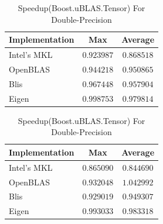 \begin{table}[ht]
    \centering
    \caption{Speedup(Boost.uBLAS.Tensor) For Single-Precision}
    \begin{tabular}{|l|c|c|}
        \hline
        \textbf{Implementation} & \textbf{Max} & \textbf{Average}\\
        \hline
        Intel's MKL         & $0.923987$& $0.868518$ \\
        \hline
        OpenBLAS            & $0.944218$& $0.950865$ \\
        \hline
        Blis                & $0.967448$& $0.957904$ \\
        \hline
        Eigen               & $0.998753$& $0.979814$ \\
        \hline
    \end{tabular}

    \vspace*{1 cm}

    \centering
    \caption{Speedup(Boost.uBLAS.Tensor) For Double-Precision}
    \begin{tabular}{|l|c|c|}
        \hline
        \textbf{Implementation} & \textbf{Max} & \textbf{Average}\\
        \hline
        Intel's MKL         & $0.865090$& $0.844690$ \\
        \hline
        OpenBLAS            & $0.932048$& $1.042992$ \\
        \hline
        Blis                & $0.929019$& $0.949307$ \\
        \hline
        Eigen               & $0.993033$& $0.983318$ \\
        \hline
    \end{tabular}
\end{table}
